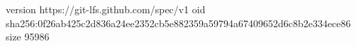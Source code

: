 version https://git-lfs.github.com/spec/v1
oid sha256:0f26ab425c2d836a24ee2352cb5e882359a59794a67409652d6c8b2e334ece86
size 95986
